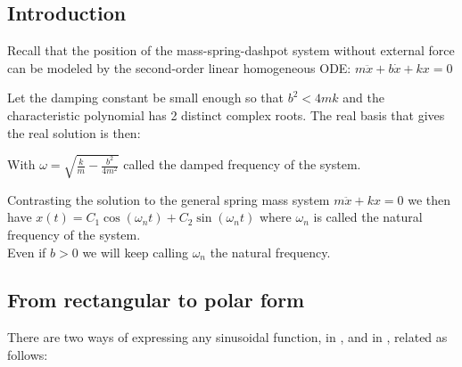 \documentclass[11pt, openright]{book}
\begin{document}
\subsection{Introduction}

Recall that the position of the mass-spring-dashpot system without external force can be modeled by the second-order linear homogeneous ODE: $m\ddot{x}+b\dot{x}+kx=0$

Let the damping constant be small enough so that $b^2<4mk$ and the characteristic polynomial has 2 distinct complex roots. The real basis that gives the real solution is then:

With $\omega=\sqrt{\frac{k}{m}-\frac{b^2}{4m^2}}$ called the damped frequency of the system.

Contrasting the solution to the general spring mass system $m\ddot{x}+kx=0$ we then have $x(t)=C_1\cos(\omega_n t)+C_2\sin(\omega_n t)$ where $\omega_n$ is called the natural frequency of the system.\\
Even if $b>0$ we will keep calling $\omega_n$ the natural frequency.

\subsection{From rectangular to polar form}

There are two ways of expressing any sinusoidal function, in , and in , related as follows:
\end{document}
